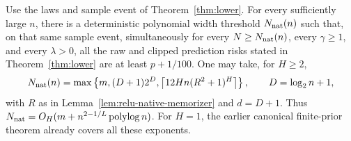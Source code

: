 \begin{theorem}
\label{thm:relu-native-all-gamma}
Use the laws and sample event of Theorem~\ref{thm:lower}.
For every sufficiently large $n$, there is a deterministic polynomial
width threshold $N_{\rm nat}(n)$ such that, on that same sample event,
simultaneously for every $N\geq N_{\rm nat}(n)$, every $\gamma\geq1$,
and every $\lambda>0$, all the raw and clipped prediction risks stated
in Theorem~\ref{thm:lower} are at least $p+1/100$.
One may take, for $H\geq2$,
\[
 N_{\rm nat}(n)=\max\left\{m,(D+1)2^D,
                  \left\lceil12Hn(R^2+1)^H\right\rceil\right\},
 \qquad D=\log_2n+1,
\]
with $R$ as in Lemma~\ref{lem:relu-native-memorizer} and $d=D+1$.
Thus $N_{\rm nat}=O_H(m+n^{2-1/L}\operatorname{polylog}n)$.
For $H=1$, the earlier canonical finite-prior theorem already covers
all these exponents.
\end{theorem}
